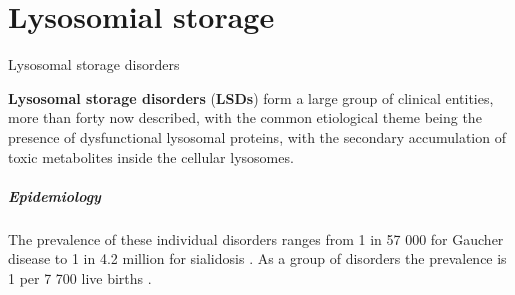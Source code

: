 \chapter{Lysosomial storage}

Lysosomal storage disorders

\textbf{Lysosomal storage disorders} (\textbf{LSDs}) form a large group of clinical entities, more than forty now described, with the common etiological theme being the presence of dysfunctional lysosomal proteins, with the secondary accumulation of toxic metabolites inside the cellular lysosomes.

\paragraph{Epidemiology}

The prevalence of these individual disorders ranges from 1 in 57 000 for Gaucher disease to 1 in 4.2 million for sialidosis . As a group of disorders the prevalence is 1 per 7 700 live births .

